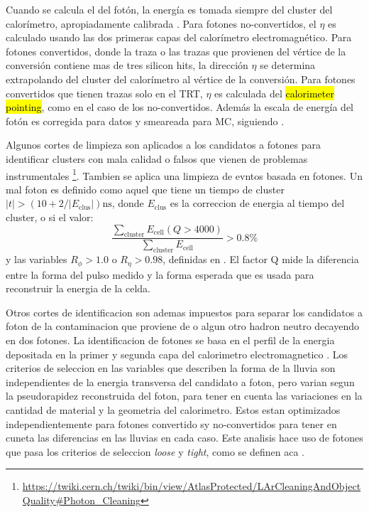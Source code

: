 Cuando se calcula el {\pt} del fotón, la energía es tomada siempre del cluster
del calorímetro, apropiadamente calibrada \cite{Banfi:1259219}.
Para fotones no-convertidos, el $\eta$ es calculado usando las dos primeras
capas del calorímetro electromagnético. Para fotones convertidos, donde la traza
o las trazas que provienen del vértice de la conversión contiene mas de tres
silicon hits, la dirección $\eta$ se determina extrapolando del cluster del
calorímetro al vértice de la conversión.
Para fotones convertidos que tienen trazas solo en el TRT, $\eta$ es calculada
del \hl{calorimeter pointing}, como en el caso de los no-convertidos. Además
la escala de energía del fotón es corregida para datos y smeareada para MC,
siguiendo \cite{EGScaleTwiki}.

Algunos cortes de limpieza son aplicados a los candidatos a fotones para
identificar clusters con mala calidad o falsos que vienen de problemas
instrumentales \footnote{\url{https://twiki.cern.ch/twiki/bin/view/AtlasProtected/LArCleaningAndObjectQuality\#Photon_Cleaning}}.
Tambien se aplica una limpieza de evntos basada en fotones. Un mal foton
es definido como aquel que tiene un tiempo de cluster $|t|>(10+2/|E_\text{clus}|) \text{ns}$,
donde $E_\text{clus}$ es la correccion de energia al tiempo del cluster,
o si el valor:
\begin{equation}
  \frac{\sum_\text{cluster} E_\text{cell}(Q>4000)}{\sum_\text{cluster} E_\text{cell} } > 0.8\%
\end{equation}
%
y las variables $R_\phi > 1.0$ o $R_\eta > 0.98$, definidas
en \cite{PhotonCleaning}. El factor Q mide la diferencia entre la forma
del pulso medido y la forma esperada que es usada para reconstruir
la energia de la celda.

Otros cortes de identificacion son ademas impuestos para separar los
candidatos a foton de la contaminacion que proviene de {\pizero} o
algun otro hadron neutro decayendo en dos fotones. La identificacion
de fotones se basa en el perfil de la energia depositada en la primer
y segunda capa del calorimetro electromagnetico \cite{ATL-PHYS-PUB-2011-007}.
Los criterios de seleccion en las variables que describen la forma de
la lluvia son independientes de la energia transversa del candidato a
foton, pero varian segun la pseudorapidez reconstruida del foton, para
tener en cuenta las variaciones en la cantidad de material y la geometria
del calorimetro. Estos estan optimizados independientemente para fotones
convertido sy no-convertidos para tener en cuneta las diferencias en las
lluvias en cada caso. Este analisis hace uso de fotones que pasa los
criterios de seleccion \emph{loose} y \emph{tight}, como se definen aca
\cite{ATL-PHYS-PUB-2011-007}.

